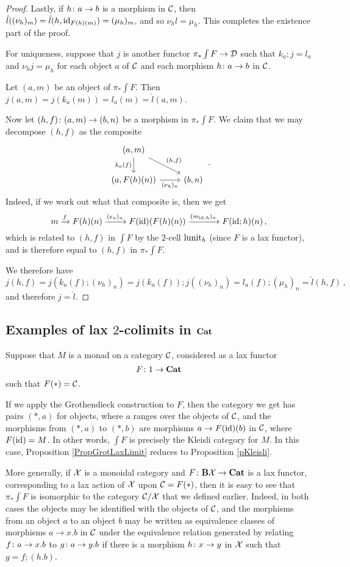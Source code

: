 \documentclass{article}
\begin{document}
\begin{proof}
  Lastly, if $h\colon a \to b$ is a morphism in ${\mathcal{C}}$, then $\hat{l}((\nu_h)_m)=\hat{l}(h,\operatorname{id}_{F(h)(m)}) = (\mu_h)_m$, and so $\nu_hl = \mu_h$.  
  This completes the existence part of the proof.

  For uniqueness, suppose that $j$ is another functor $\pi_*\int F \to {\mathcal{D}}$ such that $k_a;j=l_a$ and $\nu_hj=\mu_h$ for each object $a$ of ${\mathcal{C}}$ and each morphism $h\colon a \to b$ in ${\mathcal{C}}$.

  Let $(a,m)$ be an object of $\pi_*\int F$.  
  Then $j(a,m)=j(k_a(m))=l_a(m)=\hat{l}(a,m)$.  

  Now let $(h,f)\colon (a,m) \to (b,n)$ be a morphism in $\pi_*\int F$.  
  We claim that we may decompose $(h,f)$ as the composite
  \[
    \begin{tikzcd}
      (a,m) \arrow[d, "k_a(f)"'] \arrow[dr, "{(h,f)}"]
        & \\
      (a,F(h)(n)) \arrow[r, "(\nu_h)_n"']
        & (b,n)
    \end{tikzcd}\,.
    \]
  Indeed, if we work out what that composite is, then we get
  \[
    m \xrightarrow{f}
    F(h)(n) \xrightarrow{(e_a)_n}
    F(\operatorname{id})(F(h)(n)) \xrightarrow{(m_{\operatorname{id},h})_n}
    F(\operatorname{id};h)(n)\,,
    \]
  which is related to $(h,f)$ in $\int F$ by the $2$-cell $\operatorname{lunit}_h$ (since $F$ is a lax functor), and is therefore equal to $(h,f)$ in $\pi_*\int F$.

  We therefore have
  \[
    j(h,f) = j(k_a(f);(\nu_h)_n) = j(k_a(f));j((\nu_h)_n) = l_a(f);(\mu_h)_n = \hat{l}(h, f)\,,
    \]
  and therefore $j=\hat{l}$.  
\end{proof}

\subsection{Examples of lax $2$-colimits in ${\normalfont\textbf{Cat}}$}

Suppose that $M$ is a monad on a category ${\mathcal{C}}$, considered as a lax functor
\[
  F\colon 1\to {\normalfont\textbf{Cat}}
  \]
such that $F(*)={\mathcal{C}}$.

If we apply the Grothendieck construction to $F$, then the category we get has pairs $(*,a)$ for objects, where $a$ ranges over the objects of ${\mathcal{C}}$, and the morphisms from $(*,a)$ to $(*,b)$ are morphisms $a \to F(\operatorname{id})(b)$ in ${\mathcal{C}}$, where $F(\operatorname{id})=M$.  
In other words, $\int F$ is precisely the Kleisli category for $M$.
In this case, Proposition \ref{PropGrotLaxLimit} reduces to Proposition \ref{pKleisli}.

More generally, if $\mathcal X$ is a monoidal category and $F\colon \mathbf B \mathcal X \to {\normalfont\textbf{Cat}}$ is a lax functor, corresponding to a lax action of $\mathcal X$ upon ${\mathcal{C}} = F(*)$, then it is easy to see that $\pi_*\int F$ is isomorphic to the category ${\mathcal{C}}/\mathcal X$ that we defined earlier.  
Indeed, in both cases the objects may be identified with the objects of ${\mathcal{C}}$, and the morphisms from an object $a$ to an object $b$ may be written as equivalence classes of morphisms $a \to x.b$ in ${\mathcal{C}}$ under the equivalence relation generated by relating $f\colon a \to x.b$ to $g\colon a \to y.b$ if there is a morphism $h\colon x \to y$ in $\mathcal X$ such that $g=f;(h.b)$.
\end{document}
